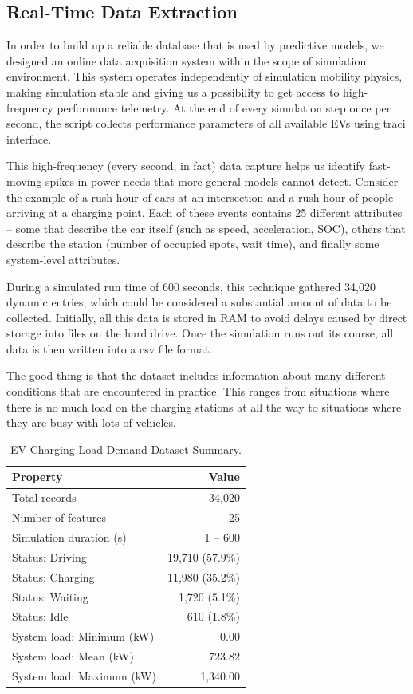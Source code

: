 \documentclass{thesis-library}
\begin{document}
\subsection{Real-Time Data Extraction}

In order to build up a reliable database that is used by predictive models, we designed an online data acquisition system within the scope of simulation environment. This system operates independently of simulation mobility physics, making simulation stable and giving us a possibility to get access to high-frequency performance telemetry. At the end of every simulation step once per second, the script collects performance parameters of all available EVs using \Gls{traci} interface.

This high-frequency (every second, in fact) data capture helps us identify fast-moving spikes in power needs that more general models cannot detect. Consider the example of a rush hour of cars at an intersection and a rush hour of people arriving at a charging point. Each of these events contains 25 different attributes – some that describe the car itself (such as speed, acceleration, SOC), others that describe the station (number of occupied spots, wait time), and finally some system-level attributes.

During a simulated run time of 600 seconds, this technique gathered 34,020 dynamic entries, which could be considered a substantial amount of data to be collected. Initially, all this data is stored in RAM to avoid delays caused by direct storage into files on the hard drive. Once the simulation runs out its course, all data is then written into a \Gls{csv} file format.

The good thing is that the dataset includes information about many different conditions that are encountered in practice. This ranges from situations where there is no much load on the charging stations at all the way to situations where they are busy with lots of vehicles.

\begin{table}[H]
\caption{EV Charging Load Demand Dataset Summary.}
\label{tab:dataset_summary}
\begin{center}
\begin{tabular}{|l|r|}
\hline
\textbf{Property} & \textbf{Value} \\
\hline
Total records & 34,020 \\
Number of features & 25 \\
Simulation duration (s) & 1 -- 600 \\
Status: Driving & 19,710 (57.9\%) \\
Status: Charging & 11,980 (35.2\%) \\
Status: Waiting & 1,720 (5.1\%) \\
Status: Idle & 610 (1.8\%) \\
System load: Minimum (kW) & 0.00 \\
System load: Mean (kW) & 723.82 \\
System load: Maximum (kW) & 1,340.00 \\
\hline
\end{tabular}
\end{center}
\end{table}
\end{document}
